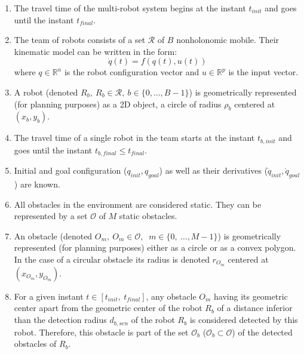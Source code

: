 \begin{enumerate}

    \item The travel time of the multi-robot system begins at
    the instant $t_{init}$ and goes until the instant $t_{final}$.

    \item The team of robots consists of a set $\mathcal{R}$ of $B$
    nonholonomic mobile. Their kinematic model can be written in the form:
    $$
    \dot{q}(t) = f(q(t),u(t))
    $$
    where $q \in \mathds{R}^n$ is the robot configuration vector and $u \in \mathds{R}^p$ is the input vector.    

    \item A robot (denoted $R_b,\ R_b \in \mathcal{R},\ b \in \{0,\dots,B-1\}$) 
    is 
    geometrically represented (for planning purposes) as a 2D object, a circle of
    radius $\rho_b$ centered at  $(x_b, y_b)$.
    
    \item The travel time of a single robot in the team starts at
    the instant $t_{b,init}$ and goes until the instant $t_{b,final} \leq 
    t_{final}$.
    
    \item Initial and goal configuration ($q_{init}, q_{goal}$) as well as their
    derivatives ($\dot{q}_{init}, \dot{q}_{goal}$) are known.
        
    \item All obstacles in the environment are considered static. They can be
    represented by a set $\mathcal{O}$ of $M$ static obstacles.
    
    \item An obstacle (denoted $O_m,\ $\mbox{$O_m \in \mathcal{O}$}$,\ $
    \mbox{$m \in \{0,\ \dots, M-1\}$}) is geometrically represented
    (for planning purposes) either as
    a circle or as a convex polygon. In the case of a circular obstacle its
    radius is denoted $r_{O_m}$ centered at $(x_{O_m},y_{O_m})$.
    
    \item For a given instant $t \in [t_{init},\ t_{final}]$, any obstacle
    $O_m$ having its geometric center apart from the geometric center of the
    robot $R_b$ of a distance inferior than the detection radius $d_{b,sen}$
    of the robot $R_b$ is considered detected by this robot.
    Therefore, this obstacle is part of the set $\mathcal{O}_b$
    ($\mathcal{O}_b \subset \mathcal{O}$) of the detected obstacles of $R_b$.
    

\end{enumerate}

